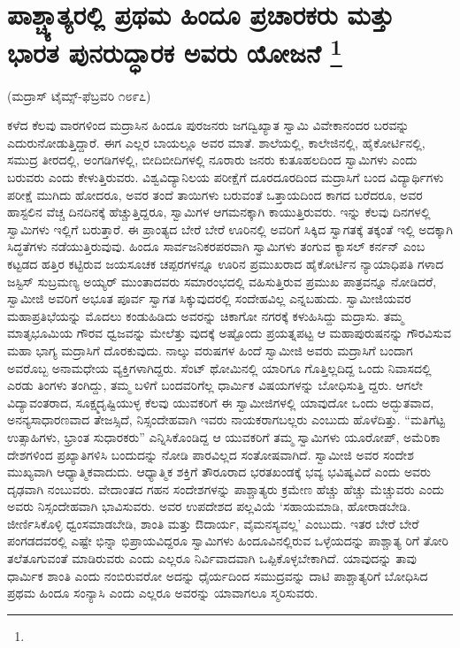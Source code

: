 
\chapter[ಪಾಶ್ಚ್ಯಾತ್ಯರಲ್ಲಿ ಪ್ರಥಮ ಹಿಂದೂ ಪ್ರಚಾರಕರು ಮತ್ತು ಭಾರತ ಪುನರುದ್ಧಾರಕ ಅವರು ಯೋಜನೆ ]{ಪಾಶ್ಚ್ಯಾತ್ಯರಲ್ಲಿ ಪ್ರಥಮ ಹಿಂದೂ ಪ್ರಚಾರಕರು ಮತ್ತು ಭಾರತ ಪುನರುದ್ಧಾರಕ ಅವರು ಯೋಜನೆ \protect\footnote{}}

(ಮದ್ರಾಸ್​ ಟೈಮ್ಸ್-ಫೆಬ್ರವರಿ ೧೮೯೭)

ಕಳೆದ ಕೆಲವು ವಾರಗಳಿಂದ ಮದ್ರಾಸಿನ ಹಿಂದೂ ಪುರಜನರು ಜಗದ್ವಿಖ್ಯಾತ ಸ್ವಾಮಿ ವಿವೇಕಾನಂದರ ಬರವನ್ನು ಎದುರುನೋಡುತ್ತಿದ್ದಾರೆ. ಈಗ ಎಲ್ಲರ ಬಾಯಲ್ಲೂ ಅವರ ಮಾತೆ. ಶಾಲೆಯಲ್ಲಿ, ಕಾಲೇಜಿನಲ್ಲಿ, ಹೈಕೋರ್ಟಿನಲ್ಲಿ, ಸಮುದ್ರ ತೀರದಲ್ಲಿ, ಅಂಗಡಿಗಳಲ್ಲಿ, ಬೀದಿಬೀದಿಗಳಲ್ಲಿ ನೂರಾರು ಜನರು ಕುತೂಹಲದಿಂದ ಸ್ವಾಮಿಗಳು ಎಂದು ಬರುವರು ಎಂದು ಕೇಳುತ್ತಿರುವರು. ವಿಶ್ವವಿದ್ಯಾನಿಲಯ ಪರೀಕ್ಷೆಗೆ ದೂರದೂರದಿಂದ ಮದ್ರಾಸಿಗೆ ಬಂದ ವಿದ್ಯಾರ್ಥಿಗಳು ಪರೀಕ್ಷೆ ಮುಗಿದು ಹೋದರೂ, ಅವರ ತಂದೆ ತಾಯಿಗಳು ಬರುವಂತೆ ಒತ್ತಾಯದಿಂದ ಕಾಗದ ಬರೆದರೂ, ಅವರ ಹಾಸ್ಟಲಿನ ವೆಚ್ಚ ದಿನದಿನಕ್ಕೆ ಹೆಚ್ಚುತ್ತಿದ್ದರೂ, ಸ್ವಾಮಿಗಳ ಆಗಮನಕ್ಕಾಗಿ ಕಾಯುತ್ತಿರುವರು. ಇನ್ನು ಕೆಲವು ದಿನಗಳಲ್ಲಿ ಸ್ವಾಮಿಗಳು ಇಲ್ಲಿಗೆ ಬರುತ್ತಾರೆ. ಈ ಪ್ರಾಂತ್ಯದ ಬೇರೆ ಬೇರೆ ಊರಿನಲ್ಲಿ ಅವರಿಗೆ ಸಿಕ್ಕಿದ ಸ್ವಾಗತಕ್ಕೆ ತಕ್ಕಂತೆ ಇಲ್ಲಿ ಅದಕ್ಕಾಗಿ ಸಿದ್ಧತೆಗಳು ನಡೆಯುತ್ತಿರುವುವು. ಹಿಂದೂ ಸಾರ್ವಜನಿಕರಪರವಾಗಿ ಸ್ವಾಮಿಗಳು ತಂಗುವ ಕ್ಯಾಸಲ್​ ಕರ್ನನ್​ ಎಂಬ ಕಟ್ಟಡದ ಹತ್ತಿರ ಕಟ್ಟಿರುವ ಜಯಸೂಚಕ ಚಪ್ಪರಗಳನ್ನೂ ಊರಿನ ಪ್ರಮುಖರಾದ ಹೈಕೋರ್ಟಿನ ನ್ಯಾಯಾಧಿಪತಿ ಗಳಾದ ಜಸ್ಟಿಸ್​ ಸುಬ್ರಮಣ್ಯ ಅಯ್ಯರ್​ ಮುಂತಾದವರು ಸಮಾರಂಭದಲ್ಲಿ ವಹಿಸುತ್ತಿರುವ ಪ್ರಮುಖ ಪಾತ್ರವನ್ನೂ ನೋಡಿದರೆ, ಸ್ವಾಮೀಜಿ ಅವರಿಗೆ ಅಭೂತ ಪೂರ್ವ ಸ್ವಾಗತ ಸಿಕ್ಕುವುದರಲ್ಲಿ ಸಂದೇಹವಿಲ್ಲ ಎನ್ನಬಹುದು. ಸ್ವಾಮೀಜಿಯವರ ಮಹಾಪ್ರತಿಭೆಯನ್ನು ಮೊದಲು ಕಂಡುಹಿಡಿದು ಅವರನ್ನು ಚಿಕಾಗೋ ನಗರಕ್ಕೆ ಕಳುಹಿಸಿದ್ದು ಮದ್ರಾಸು. ತಮ್ಮ ಮಾತೃಭೂಮಿಯ ಗೌರವ ಧ್ವಜವನ್ನು ಮೇಲೆತ್ತು ವುದಕ್ಕೆ ಅಷ್ಟೊಂದು ಪ್ರಯತ್ನಪಟ್ಟ ಆ ಮಹಾಪುರುಷನನ್ನು ಗೌರವಿಸುವ ಮಹಾ ಭಾಗ್ಯ ಮದ್ರಾಸಿಗೆ ದೊರಕುವುದು. ನಾಲ್ಕು ವರುಷಗಳ ಹಿಂದೆ ಸ್ವಾಮೀಜಿ ಅವರು ಮದ್ರಾಸಿಗೆ ಬಂದಾಗ ಅವರೊಬ್ಬ ಅನಾಮಧೇಯ ವ್ಯಕ್ತಿಗಳಾಗಿದ್ದರು. ಸೆಂಟ್​ ಥೋಮಿನಲ್ಲಿ ಯಾರಿಗೂ ಗೊತ್ತಿಲ್ಲದಿದ್ದ ಒಂದು ನಿವಾಸದಲ್ಲಿ ಎರಡು ತಿಂಗಳು ತಂಗಿದ್ದು, ತಮ್ಮ ಬಳಿಗೆ ಬಂದವರಿಗೆಲ್ಲ ಧಾರ್ಮಿಕ ವಿಷಯಗಳನ್ನು ಬೋಧಿಸುತ್ತಿ ದ್ದರು. ಆಗಲೇ ವಿದ್ಯಾವಂತರಾದ, ಸೂಕ್ಷ್ಮದೃಷ್ಟಿಯುಳ್ಳ ಕೆಲವು ಯುವಕರಿಗೆ ಈ ಸ್ವಾಮೀಜಿಗಳಲ್ಲಿ ಯಾವುದೋ ಒಂದು ಅದ್ಭುತವಾದ, ಅನನ್ಯಸಾಧಾರಣವಾದ ತೇಜಸ್ಸಿದೆ, ನಿಸ್ಸಂದೇಹವಾಗಿ ಇವರು ನಾಯಕರಾಗಬಲ್ಲರು ಎಂಬುದು ಹೊಳೆದಿತ್ತು. “ಮತಿಗೆಟ್ಟ ಉತ್ಸಾಹಿಗಳು, ಭ್ರಾಂತ ಸುಧಾರಕರು” ಎನ್ನಿಸಿಕೊಂಡಿದ್ದ ಆ ಯುವಕರಿಗೆ ತಮ್ಮ ಸ್ವಾಮಿಗಳು ಯೂರೋಪ್​, ಅಮೆರಿಕಾ ದೇಶಗಳಿಂದ ಪ್ರಖ್ಯಾತಿಗಳಿಸಿ ಬಂದುದನ್ನು ನೋಡಿ ಪಾರವಿಲ್ಲದ ಸಂತೋಷವಾಗಿದೆ. ಸ್ವಾಮೀಜಿ ಅವರ ಸಂದೇಶ ಮುಖ್ಯವಾಗಿ ಆಧ್ಯಾತ್ಮಿಕವಾದುದು. ಆಧ್ಯಾತ್ಮಿಕ ಶಕ್ತಿಗೆ ತೌರೂರಾದ ಭರತಖಂಡಕ್ಕೆ ಭವ್ಯ ಭವಿಷ್ಯವಿದೆ ಎಂದು ಅವರು ದೃಢವಾಗಿ ನಂಬುವರು. ವೇದಾಂತದ ಗಹನ ಸಂದೇಶಗಳನ್ನು ಪಾಶ್ಚಾತ್ಯರು ಕ್ರಮೇಣ ಹೆಚ್ಚು ಹೆಚ್ಚು ಮೆಚ್ಚುವರು ಎಂದು ಅವರು ನಿಸ್ಸಂದೇಹವಾಗಿ ಭಾವಿಸುವರು. ಅವರ ಉಪದೇಶದ ಪಲ್ಲವಿಯೆ ‘ಸಹಾಯಮಾಡಿ, ಹೋರಾಡಬೇಡಿ. ಜೀರ್ಣಿಸಿಕೊಳ್ಳಿ ಧ್ವಂಸಮಾಡಬೇಡಿ, ಶಾಂತಿ ಮತ್ತು ಔದಾರ್ಯ, ವೈಮನಸ್ಯವಲ್ಲ’ ಎಂಬುದು. ಇತರ ಬೇರೆ ಬೇರೆ ಪಂಗಡದವರಲ್ಲಿ ಎಷ್ಟೇ ಭಿನ್ನಾ ಭಿಪ್ರಾಯವಿದ್ದರೂ ಸ್ವಾಮಿಗಳು ಹಿಂದೂವಿನಲ್ಲಿರುವ ಒಳ್ಳೆಯದನ್ನು ಪಾಶ್ಚಾತ್ಯ ರಿಗೆ ತೋರಿ ತಲೆತೂಗುವಂತೆ ಮಾಡಿರುವರು ಎಂದು ಎಲ್ಲರೂ ನಿರ್ವಿವಾದವಾಗಿ ಒಪ್ಪಿಕೊಳ್ಳಬೇಕಾಗಿದೆ. ಯಾವುದನ್ನು ತಾವು ಧಾರ್ಮಿಕ ಶಾಂತಿ ಎಂದು ನಂಬಿರುವರೋ ಅದನ್ನು ಧೈರ್ಯದಿಂದ ಸಮುದ್ರವನ್ನು ದಾಟಿ ಪಾಶ್ಚಾತ್ಯರಿಗೆ ಬೋಧಿಸಿದ ಪ್ರಥಮ ಹಿಂದೂ ಸಂನ್ಯಾಸಿ ಎಂದು ಎಲ್ಲರೂ ಅವರನ್ನು ಯಾವಾಗಲೂ ಸ್ಮರಿಸುವರು.

